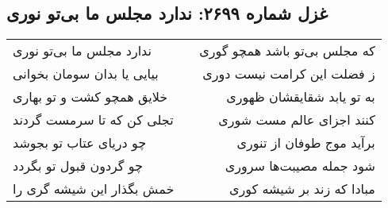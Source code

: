\begin{center}
\section*{غزل شماره ۲۶۹۹: ندارد مجلس ما بی‌تو نوری}
\label{sec:2699}
\begin{longtable}{l p{0.5cm} r}
ندارد مجلس ما بی‌تو نوری
&&
که مجلس بی‌تو باشد همچو گوری
\\
بیایی یا بدان سومان بخوانی
&&
ز فضلت این کرامت نیست دوری
\\
خلایق همچو کشت و تو بهاری
&&
به تو یابد شقایقشان ظهوری
\\
تجلی کن که تا سرمست گردند
&&
کنند اجزای عالم مست شوری
\\
چو دریای عتاب تو بجوشد
&&
برآید موج طوفان از تنوری
\\
چو گردون قبول تو بگردد
&&
شود جمله مصیبت‌ها سروری
\\
خمش بگذار این شیشه گری را
&&
مبادا که زند بر شیشه کوری
\\
\end{longtable}
\end{center}
